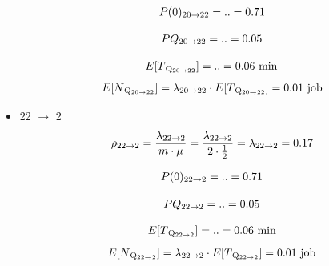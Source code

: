 \documentclass[a4paper, 12pt]{article}
\begin{document}
\begin{itemize}
\[
\begin{aligned}
  P(0)\textsubscript{20$\rightarrow$22} = .. = 0.71 
\end{aligned}
\]

\[
\begin{aligned}
  PQ\textsubscript{20$\rightarrow$22} = .. = 0.05 
\end{aligned}
\]

\[
\begin{aligned}
  E[T\textsubscript{Q\textsubscript{20$\rightarrow$22}}] = .. = 0.06 \text{ min} 
\end{aligned}
\]
\[
\begin{aligned}
  E[N\textsubscript{Q\textsubscript{20$\rightarrow$22}}] = \lambda\textsubscript{20$\rightarrow$22}
\cdot E[T\textsubscript{Q\textsubscript{20$\rightarrow$22}}] = 0.01 \text{ job} 
\end{aligned}
\]


\item 22 $\rightarrow$ 2
\[
\begin{aligned}
  \rho\textsubscript{22$\rightarrow$2} = \frac{\lambda\textsubscript{22$\rightarrow$2}}{m \cdot \mu}
= \frac{\lambda\textsubscript{22$\rightarrow$2}}{2 \cdot \frac{1}{2}} =\lambda\textsubscript{22$\rightarrow$2} = 0.17
\end{aligned}
\]

\[
\begin{aligned}
  P(0)\textsubscript{22$\rightarrow$2} = .. = 0.71 
\end{aligned}
\]

\[
\begin{aligned}
  PQ\textsubscript{22$\rightarrow$2} = .. = 0.05 
\end{aligned}
\]

\[
\begin{aligned}
  E[T\textsubscript{Q\textsubscript{22$\rightarrow$2}}] = .. = 0.06 \text{ min} 
\end{aligned}
\]
\[
\begin{aligned}
  E[N\textsubscript{Q\textsubscript{22$\rightarrow$2}}] = \lambda\textsubscript{22$\rightarrow$2}
\cdot E[T\textsubscript{Q\textsubscript{22$\rightarrow$2}}] = 0.01 \text{ job} 
\end{aligned}
\]
\end{itemize}
\end{document}
